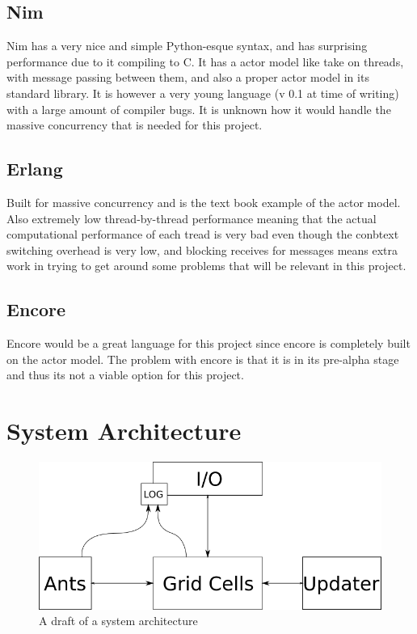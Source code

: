 \documentclass[a4paper]{article}
\begin{document}
\subsection{Nim}
Nim has a very nice and simple Python-esque syntax, and has surprising performance due to it
compiling to C. It has a actor model like take on threads, with message
passing between them, and also a proper actor model in its standard library. It is however a
very young language (v 0.1 at time of writing) with a large amount of compiler bugs. It is
unknown how it would handle the massive concurrency that is needed for this project. 

\subsection{Erlang}
Built for massive concurrency and is the text book example of the actor model. Also extremely
low thread-by-thread performance meaning that the actual computational
performance of each tread is very bad even though the conbtext switching
overhead is very low, and blocking receives for messages means extra work in
trying to get around some problems that will be relevant in this project.

\subsection{Encore}
Encore would be a great language for this project since encore is completely
built on the actor model. The problem with encore is that it is in its pre-alpha stage and thus its not a viable option for this project.

\section{System Architecture}
\begin{figure}[h!]
\centerline{
\includegraphics[scale=0.6]{images/architecture.png} 
}
\caption{A draft of a system architecture} 
\label{fig:arch}
\end{figure}
\end{document}
